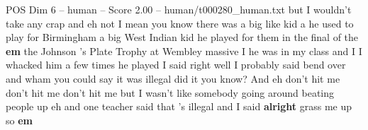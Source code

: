\begin{textsample}{POS Dim 6 – human – Score 2.00 – human/t000280\_human.txt}  \label{ex:f6_pos_004}
but I wouldn't take any crap and eh not I mean you know there was a big like kid a he used to play for Birmingham a big West Indian kid he played for them in the final of the \textbf{em} the Johnson 's Plate Trophy at Wembley massive I he was in my class and I I whacked him a few times he played I said right well I probably said bend over and wham you could say it was illegal did it you know?
And eh don't hit me don't hit me don't hit me but I wasn't like somebody going around beating people up eh and one teacher said that 's illegal and I said \textbf{alright} grass me up so \textbf{em}

\end{textsample}
